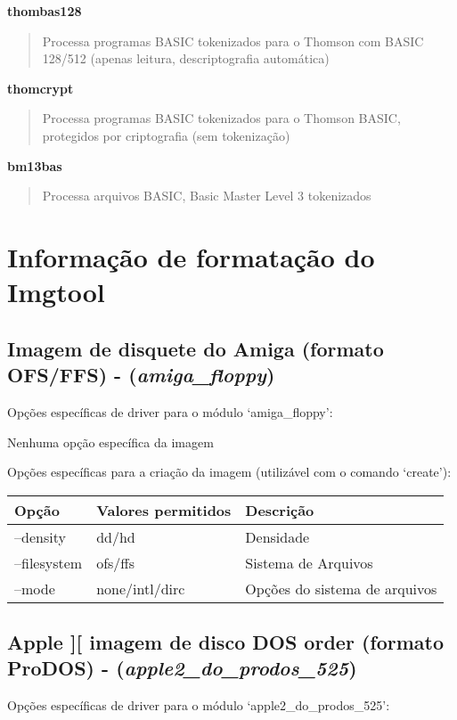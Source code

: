 \documentclass[letterpaper,10pt,brazil]{sphinxmanual}
\begin{document}
\textbf{thombas128}
\begin{quote}

Processa programas BASIC tokenizados para o Thomson com BASIC 128/512 (apenas leitura, descriptografia automática)
\end{quote}

\textbf{thomcrypt}
\begin{quote}

Processa programas BASIC tokenizados para o Thomson BASIC, protegidos por criptografia (sem tokenização)
\end{quote}

\textbf{bm13bas}
\begin{quote}

Processa arquivos BASIC, Basic Master Level 3 tokenizados
\end{quote}


\section{Informação de formatação do Imgtool}
\label{tools/imgtool:informacao-de-formatacao-do-imgtool}

\subsection{Imagem de disquete do Amiga (formato OFS/FFS) - (\emph{amiga\_floppy})}
\label{tools/imgtool:imagem-de-disquete-do-amiga-formato-ofs-ffs-amiga-floppy}
Opções específicas de driver para o módulo `amiga\_floppy':

Nenhuma opção específica da imagem

Opções específicas para a criação da imagem (utilizável com o comando `create'):

\noindent\begin{tabulary}{\linewidth}{|L|L|L|}
\hline

Opção
&
Valores permitidos
&
Descrição
\\
\hline
--density
&
dd/hd
&
Densidade
\\
\hline
--filesystem
&
ofs/ffs
&
Sistema de Arquivos
\\
\hline
--mode
&
none/intl/dirc
&
Opções do sistema de arquivos
\\
\hline\end{tabulary}



\subsection{Apple {]}{[} imagem de disco DOS order (formato ProDOS) - (\emph{apple2\_do\_prodos\_525})}
\label{tools/imgtool:apple-imagem-de-disco-dos-order-formato-prodos-apple2-do-prodos-525}
Opções específicas de driver para o módulo `apple2\_do\_prodos\_525':
\end{document}
